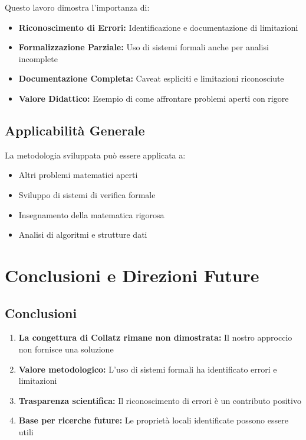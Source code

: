\documentclass[11pt,a4paper]{article}
\begin{document}
Questo lavoro dimostra l'importanza di:
\begin{itemize}
\item \textbf{Riconoscimento di Errori:} Identificazione e documentazione di limitazioni
\item \textbf{Formalizzazione Parziale:} Uso di sistemi formali anche per analisi incomplete
\item \textbf{Documentazione Completa:} Caveat espliciti e limitazioni riconosciute
\item \textbf{Valore Didattico:} Esempio di come affrontare problemi aperti con rigore
\end{itemize}

\subsection{Applicabilità Generale}

La metodologia sviluppata può essere applicata a:
\begin{itemize}
\item Altri problemi matematici aperti
\item Sviluppo di sistemi di verifica formale
\item Insegnamento della matematica rigorosa
\item Analisi di algoritmi e strutture dati
\end{itemize}

\section{Conclusioni e Direzioni Future}

\subsection{Conclusioni}

\begin{enumerate}
\item \textbf{La congettura di Collatz rimane non dimostrata:} Il nostro approccio non fornisce una soluzione
\item \textbf{Valore metodologico:} L'uso di sistemi formali ha identificato errori e limitazioni
\item \textbf{Trasparenza scientifica:} Il riconoscimento di errori è un contributo positivo
\item \textbf{Base per ricerche future:} Le proprietà locali identificate possono essere utili
\end{enumerate}
\end{document}
